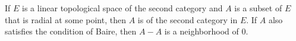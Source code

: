 If $E$ is a linear topological space of the second category and $A$ is a subset of $E$ that is radial at some point, then $A$ is of the second category in $E$. If $A$ also satisfies the condition of Baire, then $A - A$ is a neighborhood of $0$.
